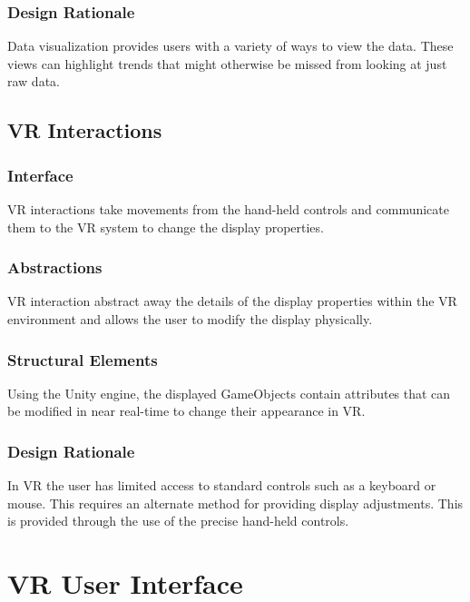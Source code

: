 \documentclass[onecolumn, draftclsnofoot,10pt, compsoc]{IEEEtran}
\begin{document}
        \subsubsection{Design Rationale}
            Data visualization provides users with a variety of ways to view the data. These views can highlight trends that might otherwise be missed from looking at just raw data.
        
    \subsection{VR Interactions}
        \subsubsection{Interface}
            VR interactions take movements from the hand-held controls and communicate them to the VR system to change the display properties.
        
        \subsubsection{Abstractions}
            VR interaction abstract away the details of the display properties within the VR environment and allows the user to modify the display physically.
        
        \subsubsection{Structural Elements}
            Using the Unity engine, the displayed GameObjects contain attributes that can be modified in near real-time to change their appearance in VR.
        
        \subsubsection{Design Rationale}
            In VR the user has limited access to standard controls such as a keyboard or mouse. This requires an alternate method for providing display adjustments. This is provided through the use of the precise hand-held controls.

\section{VR User Interface}
\end{document}
